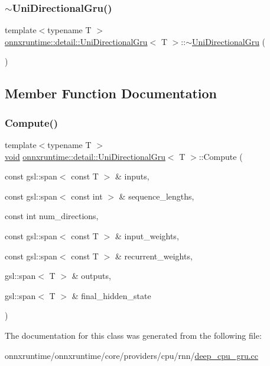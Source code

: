 \subsubsection{\texorpdfstring{$\sim$\+Uni\+Directional\+Gru()}{~UniDirectionalGru()}}
{\footnotesize\ttfamily template$<$typename T $>$ \\
\mbox{\hyperlink{classonnxruntime_1_1detail_1_1UniDirectionalGru}{onnxruntime\+::detail\+::\+Uni\+Directional\+Gru}}$<$ T $>$\+::$\sim$\mbox{\hyperlink{classonnxruntime_1_1detail_1_1UniDirectionalGru}{Uni\+Directional\+Gru}} (\begin{DoxyParamCaption}{ }\end{DoxyParamCaption})\hspace{0.3cm}{\ttfamily [default]}}



\subsection{Member Function Documentation}
\mbox{\label{classonnxruntime_1_1detail_1_1UniDirectionalGru_a1b10ea620a8cc1e2957b01fabc9313f9}} 
\subsubsection{\texorpdfstring{Compute()}{Compute()}}
{\footnotesize\ttfamily template$<$typename T $>$ \\
\mbox{\hyperlink{mlasi_8h_a88f941d423cb2a819b70a1358982b1a6}{void}} \mbox{\hyperlink{classonnxruntime_1_1detail_1_1UniDirectionalGru}{onnxruntime\+::detail\+::\+Uni\+Directional\+Gru}}$<$ T $>$\+::Compute (\begin{DoxyParamCaption}\item[{const gsl\+::span$<$ const T $>$ \&}]{inputs,  }\item[{const gsl\+::span$<$ const int $>$ \&}]{sequence\+\_\+lengths,  }\item[{const int}]{num\+\_\+directions,  }\item[{const gsl\+::span$<$ const T $>$ \&}]{input\+\_\+weights,  }\item[{const gsl\+::span$<$ const T $>$ \&}]{recurrent\+\_\+weights,  }\item[{gsl\+::span$<$ T $>$ \&}]{outputs,  }\item[{gsl\+::span$<$ T $>$ \&}]{final\+\_\+hidden\+\_\+state }\end{DoxyParamCaption})}



The documentation for this class was generated from the following file\+:\begin{DoxyCompactItemize}
\item 
onnxruntime/onnxruntime/core/providers/cpu/rnn/\mbox{\hyperlink{deep__cpu__gru_8cc}{deep\+\_\+cpu\+\_\+gru.\+cc}}\end{DoxyCompactItemize}
